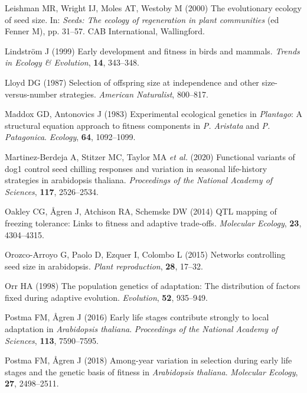 \documentclass[]{article}
\begin{document}
\leavevmode\hypertarget{ref-Leishman2000}{}%
Leishman MR, Wright IJ, Moles AT, Westoby M (2000) The evolutionary ecology of seed size. In: \emph{Seeds: The ecology of regeneration in plant communities} (ed Fenner M), pp. 31--57. CAB International, Wallingford.

\leavevmode\hypertarget{ref-lindstrom1999early}{}%
Lindström J (1999) Early development and fitness in birds and mammals. \emph{Trends in Ecology \& Evolution}, \textbf{14}, 343--348.

\leavevmode\hypertarget{ref-Lloyd1987}{}%
Lloyd DG (1987) Selection of offspring size at independence and other size-versus-number strategies. \emph{American Naturalist}, 800--817.

\leavevmode\hypertarget{ref-Maddox1983}{}%
Maddox GD, Antonovics J (1983) Experimental ecological genetics in \emph{Plantago}: A structural equation approach to fitness components in \emph{P. Aristata} and \emph{P. Patagonica}. \emph{Ecology}, \textbf{64}, 1092--1099.

\leavevmode\hypertarget{ref-martinez2020functional}{}%
Martinez-Berdeja A, Stitzer MC, Taylor MA \emph{et al.} (2020) Functional variants of dog1 control seed chilling responses and variation in seasonal life-history strategies in arabidopsis thaliana. \emph{Proceedings of the National Academy of Sciences}, \textbf{117}, 2526--2534.

\leavevmode\hypertarget{ref-oakley2014qtl}{}%
Oakley CG, Ågren J, Atchison RA, Schemske DW (2014) QTL mapping of freezing tolerance: Links to fitness and adaptive trade-offs. \emph{Molecular Ecology}, \textbf{23}, 4304--4315.

\leavevmode\hypertarget{ref-orozco2015networks}{}%
Orozco-Arroyo G, Paolo D, Ezquer I, Colombo L (2015) Networks controlling seed size in arabidopsis. \emph{Plant reproduction}, \textbf{28}, 17--32.

\leavevmode\hypertarget{ref-orr1998population}{}%
Orr HA (1998) The population genetics of adaptation: The distribution of factors fixed during adaptive evolution. \emph{Evolution}, \textbf{52}, 935--949.

\leavevmode\hypertarget{ref-postma_early_2016}{}%
Postma FM, Ågren J (2016) Early life stages contribute strongly to local adaptation in \emph{Arabidopsis thaliana}. \emph{Proceedings of the National Academy of Sciences}, \textbf{113}, 7590--7595.

\leavevmode\hypertarget{ref-postma2018among}{}%
Postma FM, Ågren J (2018) Among-year variation in selection during early life stages and the genetic basis of fitness in \emph{Arabidopsis thaliana}. \emph{Molecular Ecology}, \textbf{27}, 2498--2511.
\end{document}
